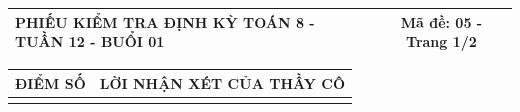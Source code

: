 \documentclass[12pt,a4paper]{article}
\begin{document}
\pagestyle{empty}
\noindent
\begin{tabularx}{\linewidth}{|X|c|}
\hline
\textbf{PHIẾU KIỂM TRA ĐỊNH KỲ TOÁN 8 - TUẦN 12 - BUỔI 01} & \textbf{Mã đề: 05 - Trang 1/2} \\
\hline
\end{tabularx}

\vspace{1.0mm}

\noindent
\begin{tabularx}{\linewidth}{|p{3.2cm}|X|}
\hline
\centering\textbf{ĐIỂM SỐ} & \centering\textbf{LỜI NHẬN XÉT CỦA THẦY CÔ} \tabularnewline
\hline
\rule{0pt}{1.8cm} & \tabularnewline
\hline
\end{tabularx}
\end{document}
